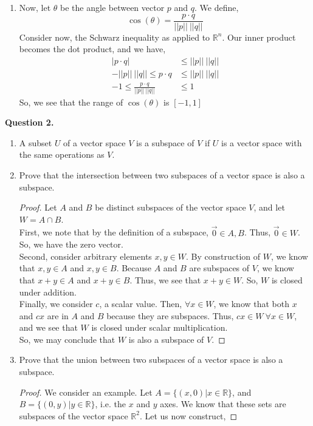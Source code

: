 \documentclass[letterpaper,10pt]{article}
\newcommand{\R}{\mathbb{R}}
\begin{document}
\begin{description}
\begin{enumerate}[label=\alph*.]
\begin{proof}
\[||p-q||\geq\big|||p||-||q||\big|\geq ||p||-||q||\]
As desired.
\end{proof}
\item Now, let $\theta$ be the angle between vector $p$ and $q$. We define,
\[\cos(\theta)=\frac{p\cdot q}{||p||\ ||q||}\]
Consider now, the Schwarz inequality as applied to $\R^n$. Our inner product becomes the dot product, and we have,
\begin{align*}
|p\cdot q| &\leq||p||\ ||q||\\
-||p||\ ||q||\leq  p\cdot q &\leq||p||\ ||q||\\
-1\leq \frac{p\cdot q}{||p||\ ||q||}&\leq1
\end{align*}
So, we see that the range of $\cos(\theta)$ is $[-1,1]$
\end{enumerate}
\item \textbf{Question 2.}
\begin{enumerate}[label=\alph*.]
\item A subset $U$ of a vector space $V$ is a subspace of $V$ if $U$ is a vector space with the same operations as $V$.
\item Prove that the intersection between two subspaces of a vector space is also a subspace.
\begin{proof}
Let $A$ and $B$ be distinct subspaces of the vector space $V$, and let $W=A\cap B$.\\
First, we note that by the definition of a subspace, $\vec{0}\in A,B$. Thus, $\vec{0}\in W$. So, we have the zero vector.\\
Second, consider arbitrary elements $x,y\in W$. By construction of $W$, we know that $x,y\in A$ and $x,y\in B$. Because $A$ and $B$ are subspaces of $V$, we know that $x+y\in A$ and $x+y\in B$. Thus, we see that $x+y\in W$. So, $W$ is closed under addition.\\
Finally, we consider $c$, a scalar value. Then, $\forall x\in W$, we know that both $x$ and $cx$ are in $A$ and $B$ because they are subspaces. Thus, $cx\in W\ \forall x\in W$, and we see that $W$ is closed under scalar multiplication.\\
So, we may conclude that $W$ is also a subspace of $V$.
\end{proof}
\item Prove that the union between two subspaces of a vector space is also a subspace.\\
\begin{proof}
We consider an example. Let $A=\{(x,0)|x\in \R\}$, and $B=\{(0,y)|y\in \R\}$, i.e. the $x$ and $y$ axes. We know that these sets are subspaces of the vector space $\R^2$. Let us now construct,

\end{proof}
\end{enumerate}
\end{description}
\end{document}

